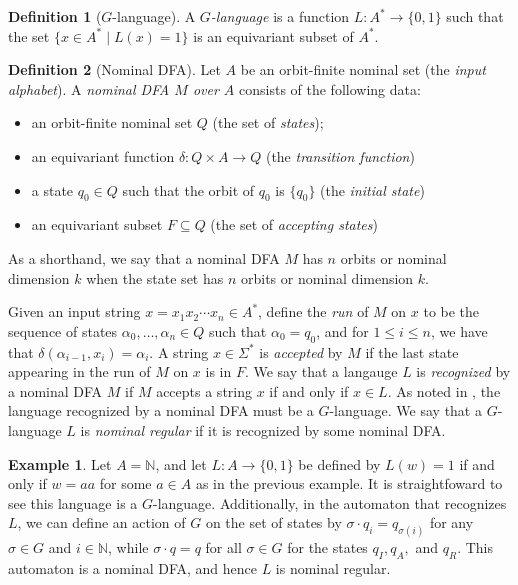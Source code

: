 \documentclass[11pt,a4paper]{amsart}
\theoremstyle{definition}
\newtheorem{definition}{Definition}
\newtheorem{example}{Example}
\newcommand{\bb}{\mathbb}
\begin{document}
\begin{definition}[$G$-language]
    A \emph{$G$-language} is a function $L : A^* \to \{0,1\}$ such that the set $\{x \in A^* \mid L(x) = 1\}$ is an equivariant subset of $A^*$. 
\end{definition}

\begin{definition}[Nominal DFA]
    Let $A$ be an orbit-finite nominal set (the \emph{input alphabet}).
    A \emph{nominal DFA $M$ over $A$} consists of the following data:
    \begin{itemize}
        \item an orbit-finite nominal set $Q$ (the set of \emph{states});
        \item an equivariant function $\delta : Q \times A \to Q$ (the \emph{transition function})
        \item a state $q_0 \in Q$ such that the orbit of $q_0$ is $\{q_0\}$ (the \emph{initial state})
        \item an equivariant subset $F \subseteq Q$ (the set of \emph{accepting states})
    \end{itemize}
\end{definition}

As a shorthand, we say that a nominal DFA $M$ has $n$ orbits or nominal dimension $k$ when the state set has $n$ orbits or nominal dimension $k$.

Given an input string $x = x_1 x_2 \cdots x_n \in A^*$, define the \emph{run} of $M$ on $x$ to be the sequence of states $\alpha_0, \ldots, \alpha_n \in Q$ such that $\alpha_0 = q_0$, and for $1 \leq i \leq n$, we have that $\delta(\alpha_{i-1}, x_i) = \alpha_i$. 
A string $x \in \Sigma^*$ is \emph{accepted} by $M$ if the last state appearing in the run of $M$ on $x$ is in $F$.
We say that a langauge $L$ is \emph{recognized} by a nominal DFA $M$ if $M$ accepts a string $x$ if and only if $x \in L$.
As noted in \cite[Definition 3.1]{bojanczyk-klin-lasota:automata-theory-in-nominal-sets}, the language recognized by a nominal DFA must be a $G$-language.
We say that a $G$-language $L$ is \emph{nominal regular} if it is recognized by some nominal DFA.

\begin{example}
    Let $A = \bb N$, and let $L : A \to \{0,1\}$ be defined by $L(w) = 1$ if and only if $w = aa$ for some $a \in A$ as in the previous example. 
    It is straightfoward to see this language is a $G$-language.
    Additionally, in the automaton that recognizes $L$, we can define an action of $G$ on the set of states by $\sigma \cdot q_i = q_{\sigma(i)}$ for any $\sigma \in G$ and $i \in \bb N$, while $\sigma \cdot q = q$ for all $\sigma \in G$ for the states $q_I, q_A,$ and $q_R$. 
    This automaton is a nominal DFA, and hence $L$ is nominal regular.
\end{example}
\end{document}
